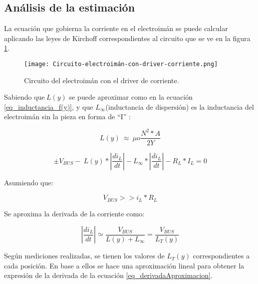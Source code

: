 \subsection{An\'{a}lisis de la estimaci\'{o}n}

\noindent La ecuaci\'{o}n que gobierna la corriente en el electroim\'{a}n se puede calcular aplicando las leyes de Kirchoff correspondientes al circuito que se ve en la figura \ref{fig:img_Circuito-electroimán-con-driver-corriente.png}.

\begin{figure}[H]
	\centering
	\texttt{[image: Circuito-electroimán-con-driver-corriente.png]}
	\caption{Circuito del electroimán con el driver de corriente.}
	\label{fig:img_Circuito-electroimán-con-driver-corriente.png}
\end{figure} 

\noindent Sabiendo que$\ L(y)$ se puede aproximar como en la ecuación \ref{eq_inductancia_f(y)}, y que $L_{\infty }$(inductancia de dispersi\'{o}n) es la inductancia del electroim\'{a}n sin la pieza en forma de ``I'' :

\begin{equation} \label{eq_inductancia_f(y)}
	L(y)\ \approx \ \mu o\frac{N^2*A}{2Y} 
\end{equation}

\begin{equation} \label{eq_VbusCondicion}
	\pm V_{BUS}-\ L(y)*\left|\frac{{di}_L}{dt}\right|-L_{\infty }*\left|\frac{{di}_L}{dt}\right|-R_L*I_L=0
\end{equation}


\noindent Asumiendo que:

\begin{equation} \label{eq_Derivadadi-dt}
	V_{BUS}>>i_L*R_L
\end{equation}
 
\noindent Se aproxima la derivada de la corriente como:

\begin{equation} \label{eq_derivadaAproximacion}
	\left|\frac{{di}_L}{dt}\right|\simeq \frac{V_{BUS}}{L(y)+L_{\infty }}=\frac{V_{BUS}}{L_T(y)}
\end{equation}

\noindent Seg\'{u}n mediciones realizadas, se tienen los valores de $L_T(y)$ correspondientes a cada posici\'{o}n. En base a ellos se hace una aproximaci\'{o}n lineal para obtener la expresi\'{o}n de la derivada de la ecuaci\'{o}n \ref{eq_derivadaAproximacion}.

